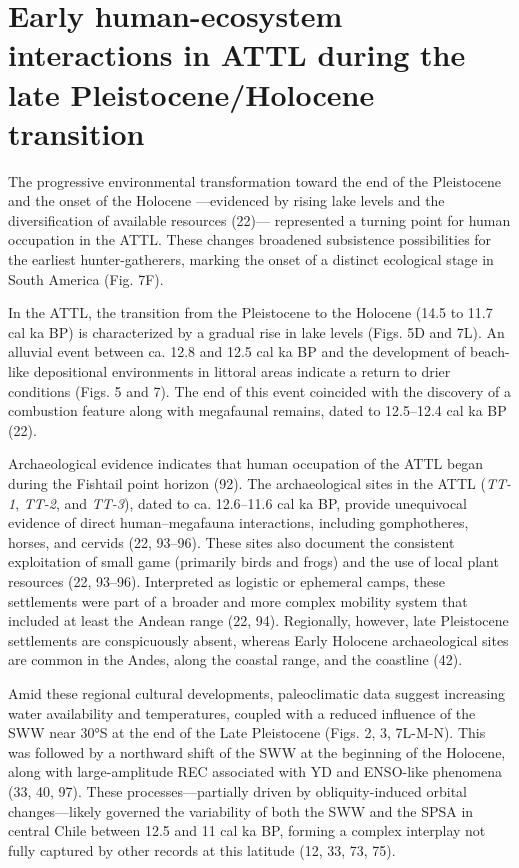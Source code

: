 \documentclass[
]{article}
\begin{document}
\section{Early human-ecosystem interactions in ATTL during the late
Pleistocene/Holocene
transition}\label{early-human-ecosystem-interactions-in-attl-during-the-late-pleistoceneholocene-transition}

The progressive environmental transformation toward the end of the
Pleistocene and the onset of the Holocene ---evidenced by rising lake
levels and the diversification of available resources (22)---
represented a turning point for human occupation in the ATTL. These
changes broadened subsistence possibilities for the earliest
hunter-gatherers, marking the onset of a distinct ecological stage in
South America (Fig. 7F).

In the ATTL, the transition from the Pleistocene to the Holocene (14.5
to 11.7 cal ka BP) is characterized by a gradual rise in lake levels
(Figs. 5D and 7L). An alluvial event between ca. 12.8 and 12.5 cal ka BP
and the development of beach-like depositional environments in littoral
areas indicate a return to drier conditions (Figs. 5 and 7). The end of
this event coincided with the discovery of a combustion feature along
with megafaunal remains, dated to 12.5--12.4 cal ka BP (22).

Archaeological evidence indicates that human occupation of the ATTL
began during the Fishtail point horizon (92). The archaeological sites
in the ATTL (\emph{TT-1}, \emph{TT-2}, and \emph{TT-3}), dated to ca.
12.6--11.6 cal ka BP, provide unequivocal evidence of direct
human--megafauna interactions, including gomphotheres, horses, and
cervids (22, 93--96). These sites also document the consistent
exploitation of small game (primarily birds and frogs) and the use of
local plant resources (22, 93--96). Interpreted as logistic or ephemeral
camps, these settlements were part of a broader and more complex
mobility system that included at least the Andean range (22, 94).
Regionally, however, late Pleistocene settlements are conspicuously
absent, whereas Early Holocene archaeological sites are common in the
Andes, along the coastal range, and the coastline (42).

Amid these regional cultural developments, paleoclimatic data suggest
increasing water availability and temperatures, coupled with a reduced
influence of the SWW near 30°S at the end of the Late Pleistocene (Figs.
2, 3, 7L-M-N). This was followed by a northward shift of the SWW at the
beginning of the Holocene, along with large-amplitude REC associated
with YD and ENSO-like phenomena (33, 40, 97). These
processes---partially driven by obliquity-induced orbital
changes---likely governed the variability of both the SWW and the SPSA
in central Chile between 12.5 and 11 cal ka BP, forming a complex
interplay not fully captured by other records at this latitude (12, 33,
73, 75).
\end{document}
